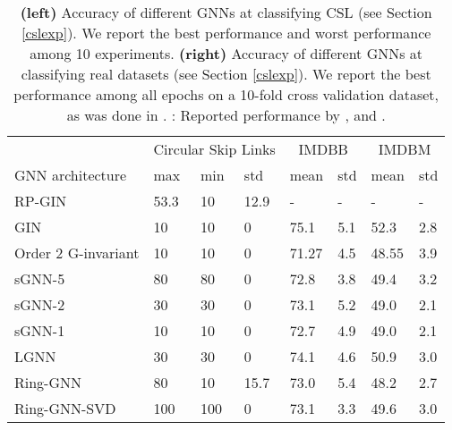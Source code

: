 \documentclass{article}
\begin{document}
\begin{table}[ht]
\centering
\begin{tabular}{l|lll||ll|ll}
\hline
& \multicolumn{3}{|c||}{Circular Skip Links} & \multicolumn{2}{c|}{IMDBB} & \multicolumn{2}{c}{IMDBM} \\
GNN architecture              & max  & min & std  & mean & std & mean & std \\
\hline \hline
RP-GIN                & 53.3 & 10  & 12.9 & -     & -     & -     & -     \\
GIN                  & 10   & 10  & 0    & 75.1  & 5.1   & 52.3  & 2.8   \\
Order 2 G-invariant  & 10   & 10  & 0    & 71.27 & 4.5   & 48.55 & 3.9   \\
sGNN-5                        & 80   & 80  & 0    & 72.8  & 3.8   & 49.4  & 3.2   \\
sGNN-2                        & 30   & 30  & 0    & 73.1  & 5.2   & 49.0    & 2.1   \\
sGNN-1                        & 10   & 10  & 0    & 72.7  & 4.9   & 49.0    & 2.1   \\
LGNN \cite{chen2019cdsbm}                         & 30   & 30  & 0    & 74.1  & 4.6   & 50.9  & 3.0     \\
Ring-GNN                          & 80   & 10  & 15.7    & 73.0  & 5.4   & 48.2  & 2.7  \\
Ring-GNN-SVD                          & 100   & 100  &  0   & 73.1  & 3.3   & 49.6  & 3.0  \\
\hline
\end{tabular}
\vspace{5pt}
\caption{\textbf{(left)} Accuracy of different GNNs at classifying CSL (see Section \ref{cslexp}). We report the best performance and worst performance among 10 experiments.
\textbf{(right)} Accuracy of different GNNs at classifying real datasets (see Section \ref{cslexp}). We report the best performance among all epochs on a 10-fold cross validation dataset, as was done in \cite{xu2018powerful}. 
: Reported performance by \cite{murphy2019relational}, \cite{xu2018powerful} and \cite{maron2018invariant}.
}
\vspace{-1.5em}
\label{table.synthetic}
\end{table}
\end{document}
